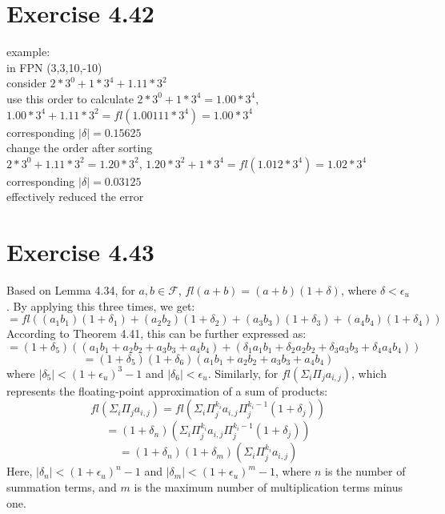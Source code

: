 \documentclass[a4paper]{article}
\begin{document}
\section*{Exercise 4.42}
example:\\
  in FPN (3,3,10,-10)\\

consider $2*3^{0}+1*3^{4}+1.11*3^{2}$\\

use this order to calculate $2*3^{0}+1*3^{4}=1.00*3^{4}$, $1.00*3^{4}+1.11*3^{2}=fl(1.00111*3^4)=1.00*3^4$\\
corresponding $|\delta|=0.15625$\\
change the order after sorting\\
$2*3^{0}+1.11*3^{2}=1.20*3^2$, $1.20*3^2+1*3^{4}=fl(1.012*3^{4})=1.02*3^{4}$\\
corresponding $|\delta|=0.03125$\\
effectively reduced the error\\

\section*{Exercise 4.43}
Based on Lemma 4.34, for \( a, b \in \mathcal{F} \), \( fl(a+b) = (a+b)(1+\delta) \), where \( \delta < \epsilon_u \). By applying this three times, we get:\\

\[ = fl((a_1b_1)(1+\delta_1) + (a_2b_2)(1+\delta_2) + (a_3b_3)(1+\delta_3) + (a_4b_4)(1+\delta_4)) \]
According to Theorem 4.41, this can be further expressed as:\\
\[ = (1+\delta_5)((a_1b_1 + a_2b_2 + a_3b_3 + a_4b_4) + (\delta_1a_1b_1 + \delta_2a_2b_2 + \delta_3a_3b_3 + \delta_4a_4b_4)) \]
\[ = (1+\delta_5)(1+\delta_6)(a_1b_1 + a_2b_2 + a_3b_3 + a_4b_4) \]
where \( |\delta_5| < (1+\epsilon_u)^3 - 1 \) and \( |\delta_6| < \epsilon_u \).
Similarly, for \( fl(\Sigma_i \Pi_j a_{i,j}) \), which represents the floating-point approximation of a sum of products:\\
\[ fl(\Sigma_i \Pi_j a_{i,j}) = fl(\Sigma_i \Pi^{k_i}_j a_{i,j} \Pi_j^{k_i-1} (1+\delta_j)) \]
\[ = (1+\delta_n)(\Sigma_i \Pi^{k_i}_j a_{i,j} \Pi_j^{k_i-1} (1+\delta_j)) \]
\[ = (1+\delta_n)(1+\delta_m)(\Sigma_i \Pi^{k_i}_j a_{i,j}) \]
Here, \( |\delta_n| < (1+\epsilon_u)^n - 1 \) and \( |\delta_m| < (1+\epsilon_u)^m - 1 \), where \( n \) is the number of summation terms, and \( m \) is the maximum number of multiplication terms minus one.\\
\end{document}
